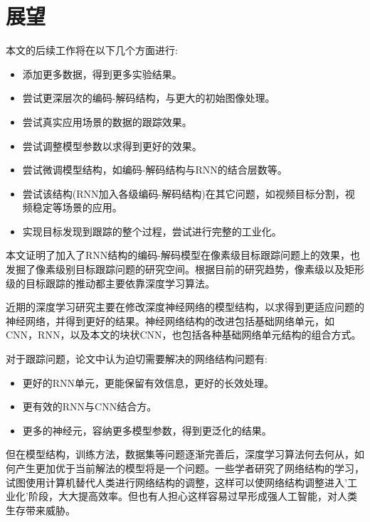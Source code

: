 \section{展望}
本文的后续工作将在以下几个方面进行:
\begin{itemize}
    \item 添加更多数据，得到更多实验结果。
    \item 尝试更深层次的编码-解码结构，与更大的初始图像处理。
    \item 尝试真实应用场景的数据的跟踪效果。
    \item 尝试调整模型参数以求得到更好的效果。
    \item 尝试微调模型结构，如编码-解码结构与RNN的结合层数等。
    \item 尝试该结构(RNN加入各级编码-解码结构)在其它问题，如视频目标分割，视频稳定等场景的应用。
    \item 实现目标发现到跟踪的整个过程，尝试进行完整的工业化。
\end{itemize}
\par
本文证明了加入了RNN结构的编码-解码模型在像素级目标跟踪问题上的效果，也发掘了像素级别目标跟踪问题的研究空间。根据目前的研究趋势，像素级以及矩形级的目标跟踪的推动都主要依靠深度学习算法。
\par
近期的深度学习研究主要在修改深度神经网络的模型结构，以求得到更适应问题的神经网络，并得到更好的结果。神经网络结构的改进包括基础网络单元，如CNN，RNN，以及本文的块状CNN，也包括各种基础网络单元结构的组合方式。
\par
对于跟踪问题，论文中认为迫切需要解决的网络结构问题有:
\begin{itemize}
    \item 更好的RNN单元，更能保留有效信息，更好的长效处理。
    \item 更有效的RNN与CNN结合方。
    \item 更多的神经元，容纳更多模型参数，得到更泛化的结果。
\end{itemize}
\par
但在模型结构，训练方法，数据集等问题逐渐完善后，深度学习算法何去何从，如何产生更加优于当前解法的模型将是一个问题。一些学者研究了网络结构的学习\supercite{cortes2017adanet}，试图使用计算机替代人类进行网络结构的调整，这样可以使网络结构调整进入'工业化'阶段，大大提高效率。但也有人担心这样容易过早形成强人工智能\supercite{kurzweil2005singularity}，对人类生存带来威胁。

